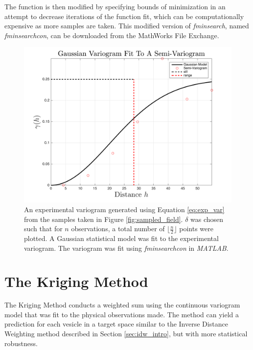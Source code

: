 The function is then modified by specifying bounds of minimization in an attempt to decrease iterations of the function fit, which can be computationally expensive as more samples are taken. This modified version of \textit{fminsearch}, named \textit{fminsearchcon}, can be downloaded from the MathWorks File Exchange.

\begin{figure}[ht!]
    \centering    
	\includegraphics[width=\linewidth]{figures/fit_kernel.png}
	\caption{An experimental variogram generated using Equation \ref{eq:exp_var} from the samples taken in Figure \ref{fig:sampled_field}. $\delta$ was chosen such that for $n$ observations, a total number of $\Big\lfloor \frac{n}{2} \Big\rfloor$ points were plotted. A Gaussian statistical model was fit to the experimental variogram. The variogram was fit using \textit{fminsearchcon} in \textit{MATLAB}.}
	\label{fig:fit_kernel}
\end{figure}

\section{The Kriging Method}
The Kriging Method conducts a weighted sum using the continuous variogram model that was fit to the physical observations made. The method can yield a prediction for each vesicle in a target space similar to the Inverse Distance Weighting method described in Section \ref{sec:idw_intro}, but with more statistical robustness.

